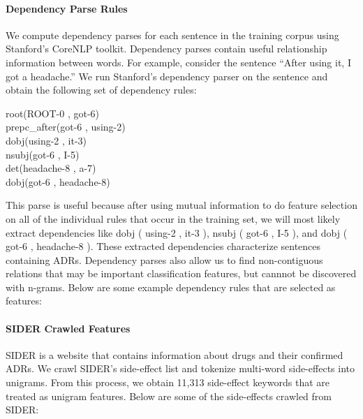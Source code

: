 \documentclass{acm_proc_article-sp}
\begin{document}
\noindent{}

\paragraph{Dependency Parse Rules}
We compute dependency parses for each sentence in the training corpus using Stanford's CoreNLP toolkit. Dependency parses contain useful relationship information between words. For example, consider the sentence ``After using it, I got a headache.'' We run Stanford's dependency parser on the sentence and obtain the following set of dependency rules:

root(ROOT-0 , got-6) \\
prepc\_after(got-6 , using-2) \\
dobj(using-2 , it-3) \\ 
nsubj(got-6 , I-5) \\
det(headache-8 , a-7) \\
dobj(got-6 , headache-8) 

This parse is useful because after using mutual information to do feature selection on all of the individual rules that occur in the training set, we will most likely extract dependencies like dobj ( using-2 , it-3 ), nsubj ( got-6 , I-5 ), and dobj ( got-6 , headache-8 ). These extracted dependencies characterize sentences containing ADRs. Dependency parses also allow us to find non-contiguous relations that may be important classification features, but cannnot be discovered with n-grams. Below are some example dependency rules that are selected as features:

\noindent{}

\paragraph{SIDER Crawled Features}
SIDER is a website that contains information about drugs and their confirmed ADRs. We crawl SIDER's side-effect list and tokenize multi-word side-effects into unigrams. From this process, we obtain 11,313 side-effect keywords that are treated as unigram features. Below are some of the side-effects crawled from SIDER:
\end{document}
